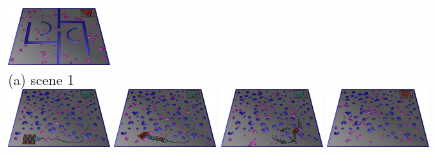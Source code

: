 \documentclass[letterpaper, 10pt, conference]{ieeeconf}
\begin{document}
\begin{figure}
\includegraphics[width=0.24\textwidth]{usef/figA_Inter8_scaled.jpg}\\[2mm]
(a) scene 1\\[2mm]
\includegraphics[width=0.24\textwidth]{usef/figB_Inter1_scaled.jpg}
\includegraphics[width=0.24\textwidth]{usef/figB_Inter2_scaled.jpg}
\includegraphics[width=0.24\textwidth]{usef/figB_Inter3_scaled.jpg}
\includegraphics[width=0.24\textwidth]{usef/figB_Inter4_scaled.jpg}\\[2mm]


\end{figure}
\end{document}
